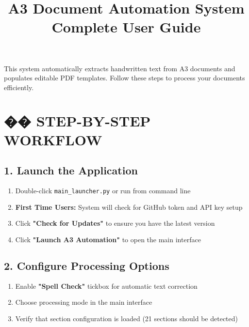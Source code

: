 \documentclass[11pt,a4paper]{article}
\title{\textbf{\Large A3 Document Automation System}\\\large Complete User Guide}
\author{}
\date{}
\begin{document}
\maketitle
\vspace{-20pt}

\begin{tcolorbox}[colback=primary!5,colframe=primary,title=\textbf{�� Quick Start Overview}]
This system automatically extracts handwritten text from A3 documents and populates editable PDF templates. Follow these steps to process your documents efficiently.
\end{tcolorbox}

\section*{�� STEP-BY-STEP WORKFLOW}

\subsection*{1. \faPlay\space Launch the Application}
\begin{enumerate}[leftmargin=*,itemsep=0pt]
    \item Double-click \texttt{main\_launcher.py} or run from command line
    \item \textcolor{primary}{\textbf{First Time Users:}} System will check for GitHub token and API key setup
    \item Click \textcolor{primary}{\textbf{"Check for Updates"}} to ensure you have the latest version
    \item Click \textcolor{success}{\textbf{"Launch A3 Automation"}} to open the main interface
\end{enumerate}

\subsection*{2. \faCog\space Configure Processing Options}
\begin{enumerate}[leftmargin=*,itemsep=0pt]
    \item Enable \textcolor{success}{\textbf{"Spell Check"}} tickbox for automatic text correction
    \item Choose processing mode in the main interface
    \item Verify that section configuration is loaded (21 sections should be detected)
\end{enumerate}
\end{document}
